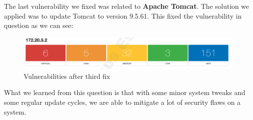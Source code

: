 The last vulnerability we fixed was related to \textbf{Apache Tomcat}. The solution we applied was to update Tomcat to version 9.5.61. This fixed the vulnerability in question as we can see:

\begin{figure}[ht!]
 	\centering
 	\includegraphics[width=1\linewidth]{img/vuln4.png}
 	\caption{Vulnerabilities after third fix}
\end{figure}

What we learned from this question is that with some minor system tweaks and some regular update cycles, we are able to mitigate a lot of security flaws on a system.

\pagebreak